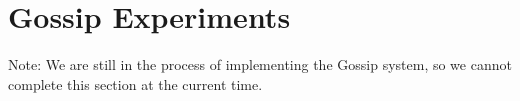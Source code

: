\section{Gossip Experiments}

Note: We are still in the process of implementing the Gossip system, so
we cannot complete this section at the current time.
